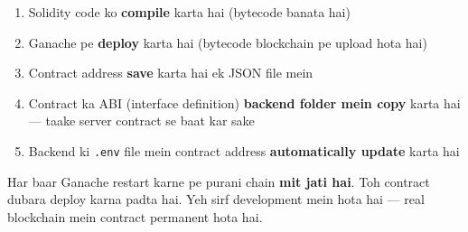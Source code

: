 \begin{enumerate}
    \item Solidity code ko \textbf{compile} karta hai (bytecode banata hai)
    \item Ganache pe \textbf{deploy} karta hai (bytecode blockchain pe upload hota hai)
    \item Contract address \textbf{save} karta hai ek JSON file mein
    \item Contract ka ABI (interface definition) \textbf{backend folder mein copy} karta hai --- taake server contract se baat kar sake
    \item Backend ki \texttt{.env} file mein contract address \textbf{automatically update} karta hai
\end{enumerate}

\begin{warnbox}[Ganache Reset = Re-deploy]
Har baar Ganache restart karne pe purani chain \textbf{mit jati hai}. Toh contract dubara deploy karna padta hai. Yeh sirf development mein hota hai --- real blockchain mein contract permanent hota hai.
\end{warnbox}
